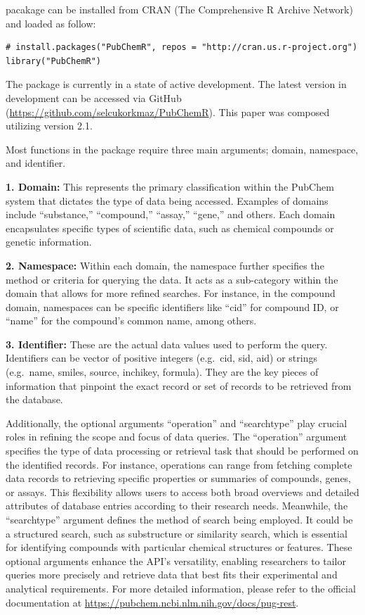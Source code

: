  pacakage can be installed from CRAN (The Comprehensive R Archive Network) and loaded as follow:

\begin{verbatim}
# install.packages("PubChemR", repos = "http://cran.us.r-project.org")
library("PubChemR")
\end{verbatim}

The package is currently in a state of active development. The latest version in development can be accessed via GitHub (\url{https://github.com/selcukorkmaz/PubChemR}). This paper was composed utilizing  version 2.1.

Most functions in the package require three main arguments; domain, namespace, and identifier.

\textbf{1. Domain:} This represents the primary classification within the PubChem system that dictates the type of data being accessed. Examples of domains include ``substance,'' ``compound,'' ``assay,'' ``gene,'' and others. Each domain encapsulates specific types of scientific data, such as chemical compounds or genetic information.

\textbf{2. Namespace:} Within each domain, the namespace further specifies the method or criteria for querying the data. It acts as a sub-category within the domain that allows for more refined searches. For instance, in the compound domain, namespaces can be specific identifiers like ``cid'' for compound ID, or ``name'' for the compound's common name, among others.

\textbf{3. Identifier:} These are the actual data values used to perform the query. Identifiers can be vector of positive integers (e.g.~cid, sid, aid) or strings (e.g.~name, smiles, source, inchikey, formula). They are the key pieces of information that pinpoint the exact record or set of records to be retrieved from the database.

Additionally, the optional arguments ``operation'' and ``searchtype'' play crucial roles in refining the scope and focus of data queries. The ``operation'' argument specifies the type of data processing or retrieval task that should be performed on the identified records. For instance, operations can range from fetching complete data records to retrieving specific properties or summaries of compounds, genes, or assays. This flexibility allows users to access both broad overviews and detailed attributes of database entries according to their research needs. Meanwhile, the ``searchtype'' argument defines the method of search being employed. It could be a structured search, such as substructure or similarity search, which is essential for identifying compounds with particular chemical structures or features. These optional arguments enhance the API's versatility, enabling researchers to tailor queries more precisely and retrieve data that best fits their experimental and analytical requirements. For more detailed information, please refer to the official documentation at \url{https://pubchem.ncbi.nlm.nih.gov/docs/pug-rest}.

